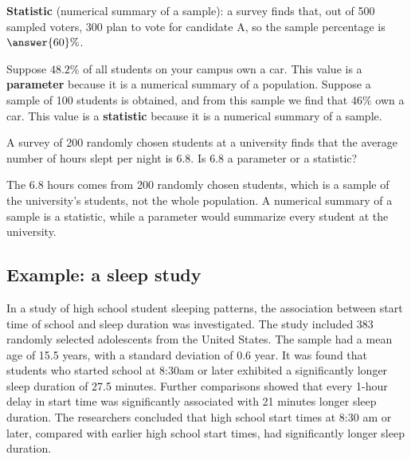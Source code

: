 \documentclass{ximera}
\begin{document}
\textbf{Statistic} (numerical summary of a sample): a survey finds that, out of 500 sampled voters, 300 plan to vote for candidate A, so the sample percentage is $\answer{60}\%$.

\begin{example}
Suppose $48.2\%$ of all students on your campus own a car. This value is a \textbf{parameter} because it is a numerical summary of a population. Suppose a sample of 100 students is obtained, and from this sample we find that $46\%$ own a car. This value is a \textbf{statistic} because it is a numerical summary of a sample.
\end{example}

\begin{problem}
A survey of 200 randomly chosen students at a university finds that the average number of hours slept per night is 6.8. Is $6.8$ a parameter or a statistic?
\begin{multipleChoice}
\end{multipleChoice}
\begin{explanation}
The 6.8 hours comes from 200 randomly chosen students, which is a sample of the university's students, not the whole population. A numerical summary of a sample is a statistic, while a parameter would summarize every student at the university.
\end{explanation}
\end{problem}

\subsection*{Example: a sleep study}

In a study of high school student sleeping patterns, the association between start time of school and sleep duration was investigated. The study included 383 randomly selected adolescents from the United States. The sample had a mean age of 15.5 years, with a standard deviation of 0.6 year. It was found that students who started school at 8:30am or later exhibited a significantly longer sleep duration of 27.5 minutes. Further comparisons showed that every 1-hour delay in start time was significantly associated with 21 minutes longer sleep duration. The researchers concluded that high school start times at 8:30 am or later, compared with earlier high school start times, had significantly longer sleep duration.
\end{document}
